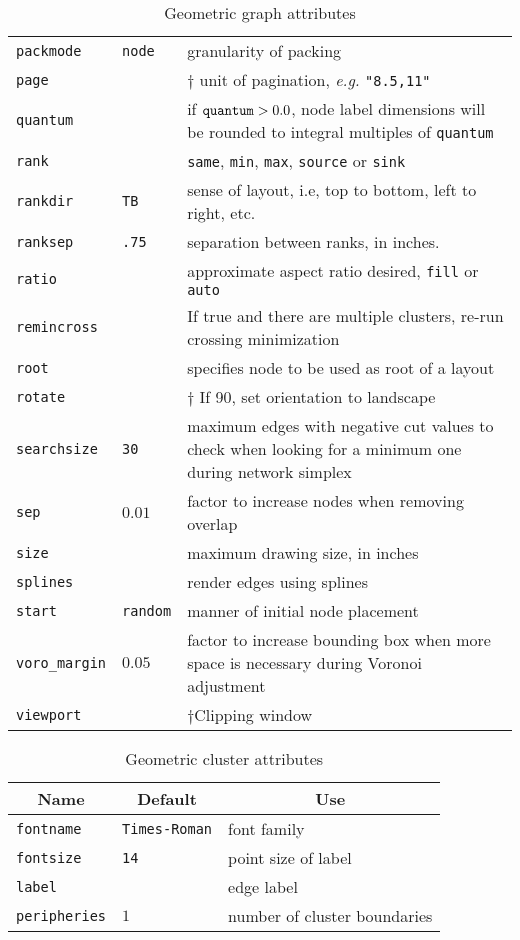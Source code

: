 \begin{table}[htbp]
\begin{tabular}[t]{|l|l|p{2.5in}|}
{\tt packmode} & {\tt node} & granularity of packing \\
{\tt page} & & $\dagger$ unit of pagination, {\it e.g.} {\tt "8.5,11"} \\
{\tt quantum} &  & if ${\tt quantum} > 0.0$, node label dimensions will be rounded to integral multiples of {\tt quantum} \\
{\tt rank} & & {\tt same}, {\tt min}, {\tt max}, {\tt source} or {\tt sink} \\
{\tt rankdir} & {\tt TB} & sense of layout, i.e, top to bottom, left to right, etc. \\
{\tt ranksep} & {\tt .75} & separation between ranks, in inches. \\
{\tt ratio} & & approximate aspect ratio desired, {\tt fill} or {\tt auto} \\
{\tt remincross} & & If true and there are multiple clusters, re-run crossing minimization \\
{\tt root} & & specifies node to be used as root of a layout \\ 
{\tt rotate} & & $\dagger$ If 90, set orientation to landscape \\
{\tt searchsize} & {\tt 30} & maximum edges with negative cut values to
check when looking for a minimum one during network simplex \\
{\tt sep} & $0.01$ & factor to increase nodes when removing overlap \\
{\tt size} & & maximum drawing size, in inches \\
{\tt splines} &  & render edges using splines \\
{\tt start} & {\tt random} & manner of initial node placement \\
{\tt voro\_margin} & $0.05$ & factor to increase bounding box when more space is necessary during Voronoi adjustment \\
{\tt viewport} & & $\dagger$Clipping window \\
\hline
\end{tabular}
\caption{Geometric graph attributes}
\label{tab:gattr_geom}
\end{table}
\begin{table}[htbp]\footnotesize
\centering
\begin{tabular}[t]{|l|l|p{2.5in}|} \hline
\multicolumn{1}{|c|}{Name} & \multicolumn{1}{c|}{Default} & \multicolumn{1}{c|}{Use} \\ \hline
{\tt fontname} & {\tt Times-Roman} & font family \\
{\tt fontsize} & {\tt 14} & point size of label \\
{\tt label} & & edge label \\
{\tt peripheries} & $1$ & number of cluster boundaries \\
\hline
\end{tabular}
\caption{Geometric cluster attributes}
\label{tab:cattr_geom}
\end{table}
